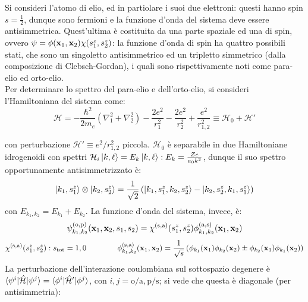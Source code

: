 \begin{example}
	Si consideri l'atomo di elio, ed in partiolare i suoi due elettroni: questi hanno spin $ s = \frac{1}{2} $, dunque sono fermioni e la funzione d'onda del sistema deve essere antisimmetrica. Quest'ultima è costituita da una parte spaziale ed una di spin, ovvero $ \psi = \phi(\mathbf{x}_1, \mathbf{x}_2) \chi(s^z_1, s^z_2) $: la funzione d'onda di spin ha quattro possibili stati, che sono un singoletto antisimmetrico ed un tripletto simmetrico (dalla composizione di Clebsch-Gordan), i quali sono rispettivamente noti come para-elio ed orto-elio.\\
	Per determinare lo spettro del para-elio e dell'orto-elio, si consideri l'Hamiltoniana del sistema come:
	\begin{equation*}
		\mathcal{H} = - \frac{\hbar^2}{2m_e} \left( \nabla_1^2 + \nabla_2^2 \right) - \frac{2e^2}{r_1^2} - \frac{2e^2}{r_2^2} + \frac{e^2}{r_{1,2}^2} \equiv \mathcal{H}_0 + \mathcal{H}'
	\end{equation*}
\end{example}
con perturbazione $ \mathcal{H}' \equiv e^2 / r_{1,2}^2 $ piccola. $ \mathcal{H}_0 $ è separabile in due Hamiltoniane idrogenoidi con spettri $ \mathcal{H}_i \ket{k,\ell} = E_k \ket{k,\ell} : E_k = \frac{Ze}{a_0 k^2} $, dunque il suo spettro opportunamente antisimmetrizzato è:
\begin{equation*}
	\ket{k_1, s_1^z} \otimes \ket{k_2, s_2^z} = \frac{1}{\sqrt{2}} \left( \ket{k_1, s_1^z, k_2, s_2^z} - \ket{k_2, s_2^z, k_1, s_1^z} \right)
\end{equation*}
con $ E_{k_1, k_2} = E_{k_1} + E_{k_2} $. La funzione d'onda del sistema, invece, è:
\begin{equation*}
	\psi^{(\mathrm{o},\mathrm{p})}_{k_1, k_2} (\mathbf{x}_1, \mathbf{x}_2, s_1, s_2) = \chi^{(\mathrm{s},\mathrm{a})}(s_1^z, s_2^z) \phi^{(\mathrm{a},\mathrm{s})}_{k_1, k_2} (\mathbf{x}_1, \mathbf{x}_2)
\end{equation*}
\begin{equation*}
	\chi^{(\mathrm{s},\mathrm{a})}(s^z_1, s^z_2) : s_\mathrm{tot} = 1,0
	\qquad\qquad
	\phi^{(\mathrm{s},\mathrm{a})}_{k_1, k_2} (\mathbf{x}_1, \mathbf{x}_2) = \frac{1}{\sqrt{s}} \left( \phi_{k_1}(\mathbf{x}_1) \phi_{k_2}(\mathbf{x}_2) \pm \phi_{k_2}(\mathbf{x}_1) \phi_{k_1}(\mathbf{x}_2) \right)
\end{equation*}
La perturbazione dell'interazione coulombiana sul sottospazio degenere è $ \braket{\psi^i | \hat{\mathcal{H}} | \psi^j} = \braket{\phi^i | \hat{\mathcal{H}}' | \phi^j} $, con $ i,j = \mathrm{o}/\mathrm{a}, \mathrm{p}/\mathrm{s} $; si vede che questa è diagonale (per antisimmetria):

